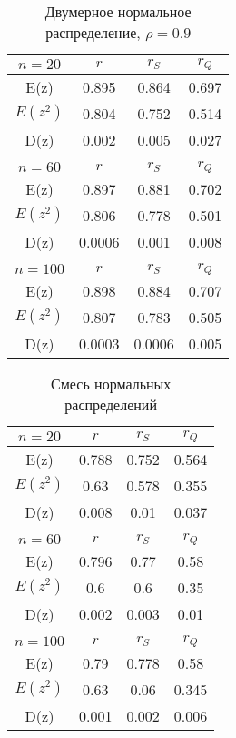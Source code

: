 \begin{table}
\begin{center}
\begin{tabular}{|c|c|c|c|}
	\hline
	$n = 20$ & $r$ & $r_S$ & $r_Q$ \\
	\hline
    E(z) & 0.895 & 0.864 & 0.697 \\
	\hline
    $E(z^2)$ & 0.804 & 0.752 & 0.514\\
	\hline
    D(z) & 0.002 & 0.005 & 0.027\\
	\hline
	&  &  & \\
	\hline
    $n = 60$ & $r$ & $r_S$ & $r_Q$\\
	\hline
    E(z) & 0.897 & 0.881 & 0.702\\
	\hline
    $E(z^2)$ & 0.806 & 0.778 & 0.501\\
	\hline
    D(z) &  0.0006 & 0.001 & 0.008 \\
	\hline
	& & & \\
	\hline
	$n = 100$ & $r$ & $r_S$ & $r_Q$\\
	\hline
    E(z) & 0.898 & 0.884 & 0.707\\
	\hline
    $E(z^2)$ & 0.807 & 0.783 & 0.505\\
	\hline
    D(z) & 0.0003 & 0.0006 & 0.005\\
	\hline
\end{tabular}
\end{center}
\caption{Двумерное нормальное распределение, $\rho = 0.9$}\label{tab:rho0.9}
\end{table}

\begin{table}
\begin{center}
\begin{tabular}{|c|c|c|c|}
	\hline
	$n = 20$ & $r$ & $r_S$ & $r_Q$ \\
	\hline
    E(z) & 0.788 & 0.752 & 0.564 \\
	\hline
    $E(z^2)$ & 0.63 & 0.578 & 0.355\\
	\hline
    D(z) & 0.008 & 0.01 & 0.037\\
	\hline
	&  &  & \\
	\hline
    $n = 60$ & $r$ & $r_S$ & $r_Q$\\
	\hline
    E(z) & 0.796 & 0.77 & 0.58\\
	\hline
    $E(z^2)$ & 0.6 & 0.6 & 0.35\\
	\hline
    D(z) & 0.002 & 0.003 & 0.01 \\
	\hline
	& & & \\
	\hline
	$n = 100$ & $r$ & $r_S$ & $r_Q$\\
	\hline
    E(z) & 0.79 & 0.778 & 0.58 \\
	\hline
    $E(z^2)$ & 0.63 & 0.06 & 0.345\\
	\hline
    D(z) & 0.001 & 0.002 & 0.006\\
	\hline
\end{tabular}
\end{center}
\caption{Смесь нормальных распределений}\label{tab:complex}
\end{table} 